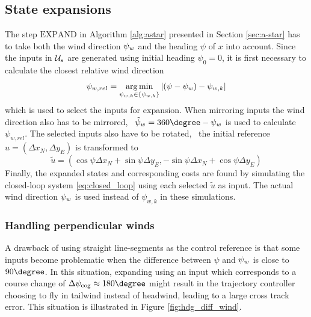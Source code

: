 \subsection{State expansions}
The step $\text{EXPAND}$ in Algorithm \ref{alg:astar} presented in Section \ref{sec:a-star} has to take both the wind direction $\psi_w$ and the heading $\psi$ of $x$ into account. 
Since the inputs in $\mathcal{U}_s$ are generated using initial heading $\psi_0=0$, it is first necessary to calculate the closest relative wind direction
\begin{equation}
    \psi_{w,rel}=\operatorname*{arg\,\text{min}}_{\psi_{w,k}\in\{\psi_{w,k}\}}|(\psi-\psi_w)-\psi_{w,k}|
\end{equation}
which is used to select the inputs for expansion. When mirroring inputs the wind direction also has to be mirrored, \ie\ 
$\tilde{\psi}_w=360\degree-\winddir$ is used to calculate $\psi_{w,rel}$. The selected inputs also have to be rotated, \ie\ the initial reference $u=(\Delta x_N, \Delta y_E)$ is transformed to 
\begin{equation}
    \tilde{u}=(\cos\psi \Delta x_N + \sin\psi \Delta y_E, -\sin\psi \Delta x_N + \cos\psi \Delta y_E)
\end{equation}
Finally, the expanded states and corresponding costs are found by simulating the closed-loop system \eqref{eq:closed_loop} using each selected $\tilde{u}$ as input. 
The actual wind direction $\psi_w$ is used instead of $\psi_{w,k}$ in these simulations.

\subsubsection{Handling perpendicular winds}
A drawback of using straight line-segments as the control reference is that some inputs become problematic when the difference between 
$\psi$ and $\psi_w$ is close to $90 \degree$. In this situation, expanding using an input which corresponds to a course change 
 of $\Delta\cog\approx180\degree$ might result in the trajectory controller choosing to fly in tailwind instead of headwind, leading to a large cross track error. This situation is 
 illustrated in Figure \ref{fig:hdg_diff_wind}.

